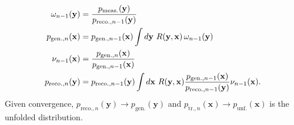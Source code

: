 \begin{align}
	\label{eq:generalUnfolding}
	\omega_{n-1}(\mathbf{y}) &= \frac{p_\mathrm{meas.}(\mathbf{y})}{p_{\mathrm{reco.}, n-1}(\mathbf{y})} \notag\\
	p_{\mathrm{gen.}, n}(\mathbf{x}) &= p_{\mathrm{gen.}, n-1}(\mathbf{x})\int d\mathbf{y}~R(\mathbf{y}, \mathbf{x})\,\omega_{n-1}(\mathbf{y})\notag\\
	\nu_{n-1}(\mathbf{x}) &= \frac{p_{\mathrm{gen.}, n}(\mathbf{x})}{p_{\mathrm{gen.}, n-1}(\mathbf{x})} \notag\\
	p_{\mathrm{reco.}, n}(\mathbf{y}) &= p_{\mathrm{reco.}, n-1}(\mathbf{y}) \int d\mathbf{x}~R(\mathbf{y}, \mathbf{x})\frac{p_{\mathrm{gen.}, n-1}(\mathbf{x})}{p_{\mathrm{reco.}, n-1}(\mathbf{y})}\nu_{n-1}(\mathbf{x}). 
\end{align}
%
Given convergence, \(p_{\mathrm{reco.}, n}(\mathbf{y}) \to p_\mathrm{gen.}(\mathbf{y})\) and \(p_{\mathrm{tr.}, n}(\mathbf{x}) \to p_{\mathrm{unf.}}(\mathbf{x})\) is the unfolded distribution. 


